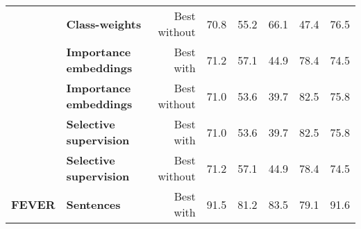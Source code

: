 \begin{table*}[]
\begin{tabular}{@{}rlrrrrrr@{}}
                                                      & \textbf{Class-weights}           & Best without                                       & 70.8                                                   & 55.2                            & 66.1                                   & 47.4                                & 76.5                                                                                                      \\ \cmidrule(l){2-8} 
                                                      & \textbf{Importance embeddings}   & Best with                                          & 71.2                                                   & 57.1                            & 44.9                                   & 78.4                                & 74.5                                                                                                      \\
                                                      & \textbf{Importance embeddings}   & Best without                                       & 71.0                                                   & 53.6                            & 39.7                                   & 82.5                                & 75.8                                                                                                      \\ \cmidrule(l){2-8} 
                                                      & \textbf{Selective supervision}   & Best with                                          & 71.0                                                   & 53.6                            & 39.7                                   & 82.5                                & 75.8                                                                                                      \\
                                                      & \textbf{Selective supervision}   & Best without                                       & 71.2                                                   & 57.1                            & 44.9                                   & 78.4                                & 74.5                                                                                                      \\ \midrule
\multirow{8}{*}{\textbf{FEVER}}                       & \textbf{Sentences}               & Best with                                          & 91.5                                                   & 81.2                            & 83.5                                   & 79.1                                & 91.6                                                                                                      \\

\end{tabular}
\end{table*}
